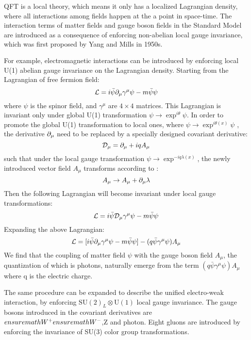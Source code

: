 QFT is a local theory, which means it only has a localized Lagrangian density, where all interactions among fields happen at the a point in space-time. The interaction terms of matter fields and gauge boson fields in the Standard Model are introduced as a consequence of enforcing non-abelian local gauge invariance, which was first proposed by Yang and Mills in 1950s. 
 
For example, electromagnetic interactions can be introduced by enforcing local U(1) abelian gauge invariance on the Lagrangian density. Starting from the Lagrangian of free fermion field:
 \begin{equation}
 \mathcal{L} = i\bar\psi \partial_\mu \gamma^\mu \psi-m\bar\psi\psi
 \end{equation}
 where $\psi$ is the spinor field, and $\gamma^\mu$ are $4\times4$ matrices. This Lagrangian is invariant only under global U(1) transformation $\psi\rightarrow \exp^{i\theta}\psi$. In order to promote the global U(1) transformation to local ones, where $\psi\rightarrow \exp^{i\theta(x)}\psi$ , the derivative $\partial_\mu$ need to be replaced by a specially designed covariant derivative:
 \begin{equation}
 \mathcal{D}_\mu = \partial_\mu+iqA_\mu
 \end{equation}
 such that under the local gauge transformation $\psi\rightarrow\exp^{-iq\lambda(x)}$, the newly introduced vector field $A_\mu$ transforms according to :
 \begin{equation}
 A_\mu\rightarrow A_{\mu}+\partial_\mu\lambda
 \end{equation}
 Then the following Lagrangian will become invariant under local gauge transformations:
  \begin{equation}
 \mathcal{L} = i\bar\psi \mathcal{D}_\mu\gamma^\mu \psi-m\bar\psi\psi
 \end{equation}
 Expanding the above Lagrangian: 
  \begin{equation}
 \mathcal{L} = [i\bar\psi \partial_\mu \gamma^\mu \psi-m\bar\psi\psi] - (q\bar\psi\gamma^\mu\psi)A_\mu
 \end{equation}
 We find that the coupling of matter field $\psi$ with the gauge boson field $A_\mu$, the quantization of which is photons, naturally emerge from the term $(q\bar\psi\gamma^\mu\psi)A_\mu$ where q is the electric charge.
 
 The same procedure can be expanded to describe the unified electro-weak interaction, by enforcing $\mathrm{SU}(2)_L\otimes\mathrm{U}(1)$ local gauge invariance. The gauge bosons introduced in the covariant derivatives are $ensuremath{W^{+}}ensuremath{W^{-}}$,Z and photon. Eight gluons are introduced by enforcing the invariance of SU(3) color group transformations.  
 
